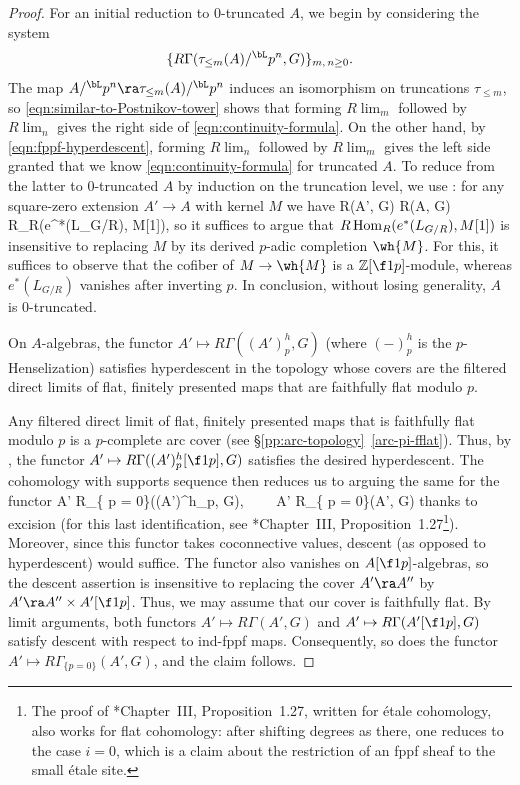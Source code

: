 \begin{proof}
For an initial reduction to $0$-truncated $A$, we begin by considering the system
\[
\{ R\Gamma(\tau_{\le m}(A)/^\bL p^n, G) \}_{m,\, n \ge 0}.
\]
The map $A/^\bL p^n \ra \tau_{\le m}(A)/^\bL p^n$ induces an isomorphism on truncations $\tau_{\le m}$, so \eqref{eqn:similar-to-Postnikov-tower} shows that forming $R\lim_m$ followed by $R\lim_n$ gives the right side of \eqref{eqn:continuity-formula}. On the other hand, by \eqref{eqn:fppf-hyperdescent}, forming $R\lim_n$ followed by $R\lim_m$ gives the left side granted that we know \eqref{eqn:continuity-formula} for truncated $A$. To reduce from the latter to $0$-truncated $A$ by induction on the truncation level, we use : for any square-zero extension $A'\to A$ with kernel $M$ we have
\be \label{def-triangle-eq}
R\Gamma(A', G) \ra R\Gamma(A, G) \ra R\Hom_R(e^*(L_{G/R}), M[1]),
\ee
so it suffices to argue that $R\operatorname{Hom}_R(e^*(L_{G/R}), M[1])$ is insensitive to replacing $M$ by its derived $p$-adic completion $\wh{M}$. For this, it suffices to observe that the cofiber of $M\to \wh{M}$ is a $\mathbb Z[\f 1p]$-module, whereas $e^*(L_{G/R})$ vanishes after inverting $p$. In conclusion, without losing generality, $A$ is $0$-truncated.


\bcl \label{claim:descent}
On $A$-algebras, the functor $A' \mapsto R\Gamma((A')^h_p, G)$ (where $(-)^h_p$ is the $p$-Henselization)
satisfies hyperdescent in the topology whose covers are the filtered direct limits of flat, finitely presented maps that are faithfully flat modulo $p$.
\ecl

\bpf
Any filtered direct limit of flat, finitely presented maps that is faithfully flat modulo $p$ is a $p$-complete arc cover (see \S\ref{pp:arc-topology}~\ref{arc-pi-fflat}). Thus, by , the functor $A' \mapsto R\Gamma((A')^h_p[\f 1p], G)$ satisfies the desired hyperdescent. The cohomology with supports sequence then reduces us to arguing the same for the functor
\be \label{elt-excision}
A' \mapsto R\Gamma_{\{ p = 0\}}((A')^h_p, G), \ \ \ \ A' \mapsto R\Gamma_{\{ p = 0\}}(A', G)
\ee
thanks to excision (for this last identification, see \cite{Mil80}*{Chapter~III, Proposition~1.27}\footnote{\label{foot:Milne}The proof of \cite{Mil80}*{Chapter~III, Proposition~1.27}, written for \'{e}tale cohomology, also works for flat cohomology: after shifting degrees as there, one reduces to the case $i = 0$, which is a claim about the restriction of an fppf sheaf to the small \'{e}tale site.}). Moreover, since this functor takes   coconnective values, descent (as opposed to hyperdescent) would suffice. The functor %
also vanishes on $A[\f 1p]$-algebras, so the descent assertion is insensitive to replacing the cover $A' \ra A''$ by $A' \ra A'' \times A'[\f 1p]$. Thus, we may assume that our cover is faithfully flat. By limit arguments, both functors $A' \mapsto R\Gamma(A', G)$ and $A' \mapsto R\Gamma(A'[\f 1p], G)$ satisfy  descent with respect to ind-fppf maps. Consequently, so does the functor $A' \mapsto R\Gamma_{\{ p = 0\}}(A', G)$, and the claim follows.
\epf


\end{proof}
